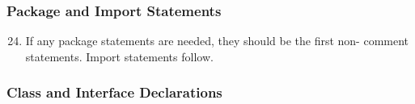 \subsubsection{Package and Import Statements} \label{sssec:import}

\begin{enumerate}
\setcounter{enumi}{23}

\item If any package statements are needed, they should be the first non- comment statements. Import statements follow.

\end{enumerate}

\subsubsection{Class and Interface Declarations} \label{sssec:decl}

